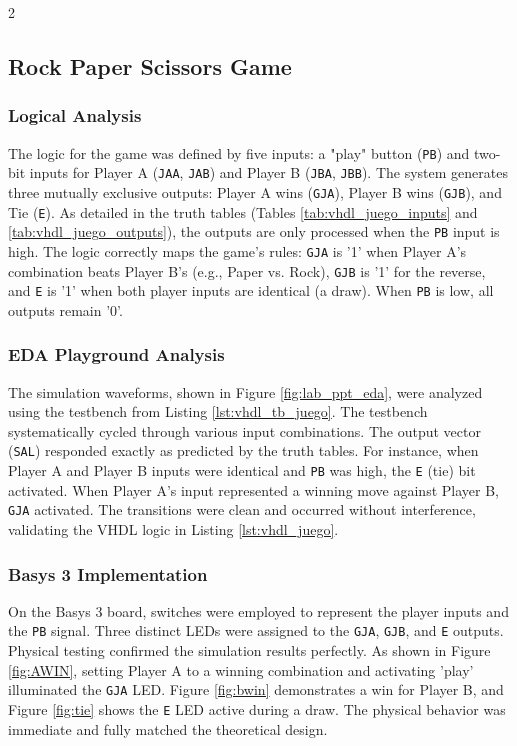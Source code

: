 \documentclass{article}
\begin{document}
\begin{multicols}{2}
\subsection{Rock Paper Scissors Game}
\subsubsection{Logical Analysis}
The logic for the game was defined by five inputs: a "play" button (\texttt{PB}) and two-bit inputs for Player A (\texttt{JAA}, \texttt{JAB}) and Player B (\texttt{JBA}, \texttt{JBB}). The system generates three mutually exclusive outputs: Player A wins (\texttt{GJA}), Player B wins (\texttt{GJB}), and Tie (\texttt{E}). As detailed in the truth tables (Tables \ref{tab:vhdl_juego_inputs} and \ref{tab:vhdl_juego_outputs}), the outputs are only processed when the \texttt{PB} input is high. The logic correctly maps the game's rules: \texttt{GJA} is '1' when Player A's combination beats Player B's (e.g., Paper vs. Rock), \texttt{GJB} is '1' for the reverse, and \texttt{E} is '1' when both player inputs are identical (a draw). When \texttt{PB} is low, all outputs remain '0'.

\subsubsection{EDA Playground Analysis}
The simulation waveforms, shown in Figure \ref{fig:lab_ppt_eda}, were analyzed using the testbench from Listing \ref{lst:vhdl_tb_juego}. The testbench systematically cycled through various input combinations. The output vector (\texttt{SAL}) responded exactly as predicted by the truth tables. For instance, when Player A and Player B inputs were identical and \texttt{PB} was high, the \texttt{E} (tie) bit activated. When Player A's input represented a winning move against Player B, \texttt{GJA} activated. The transitions were clean and occurred without interference, validating the VHDL logic in Listing \ref{lst:vhdl_juego}.

\subsubsection{Basys 3 Implementation}
On the Basys 3 board, switches were employed to represent the player inputs and the \texttt{PB} signal. Three distinct LEDs were assigned to the \texttt{GJA}, \texttt{GJB}, and \texttt{E} outputs. Physical testing confirmed the simulation results perfectly. As shown in Figure \ref{fig:AWIN}, setting Player A to a winning combination and activating 'play' illuminated the \texttt{GJA} LED. Figure \ref{fig:bwin} demonstrates a win for Player B, and Figure \ref{fig:tie} shows the \texttt{E} LED active during a draw. The physical behavior was immediate and fully matched the theoretical design.


\end{multicols}
\end{document}
